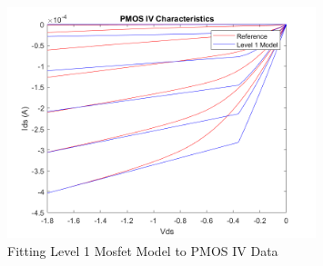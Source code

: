 \documentclass[fleqn]{article}
\begin{document}
	\begin{figure}[H]
		\centerline{\includegraphics[width=0.8\textwidth]{pmos_iv_fit.png}}
		\caption{Fitting Level 1 Mosfet Model to PMOS IV Data}
		\label{fig::pmos_iv_fit}
	\end{figure}
\end{document}
